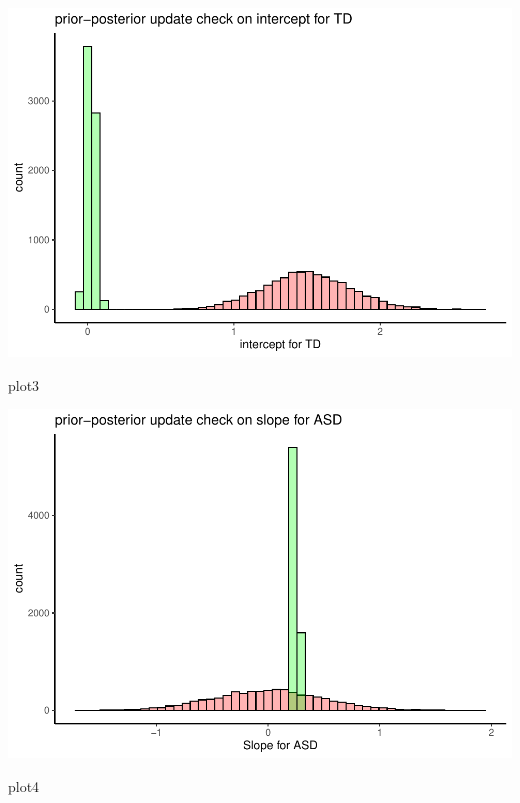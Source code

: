 \documentclass[
]{article}
\newenvironment{Shaded}{\begin{snugshade}}{\end{snugshade}}
\newcommand{\NormalTok}[1]{#1}
\begin{document}
\includegraphics{assignment_1_final_files/figure-latex/unnamed-chunk-14-2.pdf}

\begin{Shaded}
\begin{Highlighting}[]
\NormalTok{plot3}
\end{Highlighting}
\end{Shaded}

\includegraphics{assignment_1_final_files/figure-latex/unnamed-chunk-14-3.pdf}

\begin{Shaded}
\begin{Highlighting}[]
\NormalTok{plot4}
\end{Highlighting}
\end{Shaded}
\end{document}

